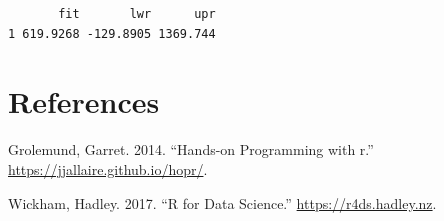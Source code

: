 \documentclass[
  letterpaper,
  DIV=11,
  numbers=noendperiod]{scrreprt}
\newlength{\cslhangindent}
\newlength{\cslentryspacingunit} %
\newenvironment{CSLReferences}[2] %
 {%
  \setlength{\parindent}{0pt}
  \ifodd #1
  \let\oldpar\par
  \def\par{\hangindent=\cslhangindent\oldpar}
  \fi
  \setlength{\parskip}{#2\cslentryspacingunit}
 }%
 {}
\begin{document}
\begin{verbatim}
       fit       lwr      upr
1 619.9268 -129.8905 1369.744
\end{verbatim}


\hypertarget{references}{%
\chapter*{References}\label{references}}


\hypertarget{refs}{}
\begin{CSLReferences}{1}{0}
\leavevmode{}%
Grolemund, Garret. 2014. {``Hands-on Programming with r.''}
\url{https://jjallaire.github.io/hopr/}.

\leavevmode{}%
Wickham, Hadley. 2017. {``R for Data Science.''}
\url{https://r4ds.hadley.nz}.

\end{CSLReferences}



\printindex
\end{document}
